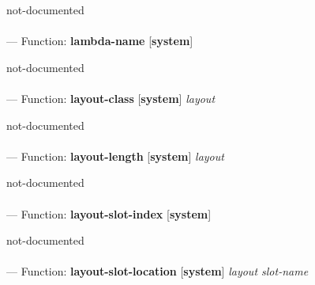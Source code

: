 \begin{adjustwidth}{5em}{5em}
not-documented
\end{adjustwidth}

\paragraph{}
\label{SYSTEM:LAMBDA-NAME}
--- Function: \textbf{lambda-name} [\textbf{system}] \textit{}

\begin{adjustwidth}{5em}{5em}
not-documented
\end{adjustwidth}

\paragraph{}
\label{SYSTEM:LAYOUT-CLASS}
--- Function: \textbf{layout-class} [\textbf{system}] \textit{layout}

\begin{adjustwidth}{5em}{5em}
not-documented
\end{adjustwidth}

\paragraph{}
\label{SYSTEM:LAYOUT-LENGTH}
--- Function: \textbf{layout-length} [\textbf{system}] \textit{layout}

\begin{adjustwidth}{5em}{5em}
not-documented
\end{adjustwidth}

\paragraph{}
\label{SYSTEM:LAYOUT-SLOT-INDEX}
--- Function: \textbf{layout-slot-index} [\textbf{system}] \textit{}

\begin{adjustwidth}{5em}{5em}
not-documented
\end{adjustwidth}

\paragraph{}
\label{SYSTEM:LAYOUT-SLOT-LOCATION}
--- Function: \textbf{layout-slot-location} [\textbf{system}] \textit{layout slot-name}

